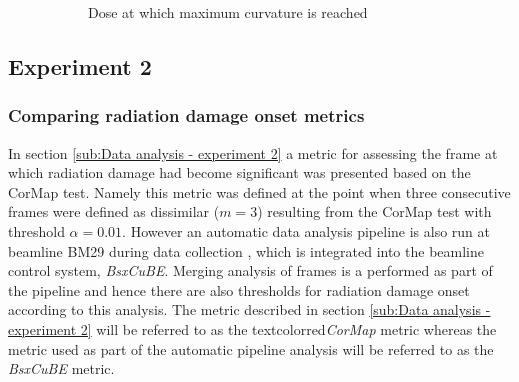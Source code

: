\begin{figure}
\begin{subfigure}[b]{0.8\textwidth}
            \caption{Dose at which maximum curvature is reached}
            \label{fig:Scavenger plot - maximum curvature}
    \end{subfigure}
    \caption{}
    \label{fig:Combined Scavenger results - Rebecca data}
\end{figure}

\subsection{Experiment 2}
\label{sub:Experiment 2 - Results}

\subsubsection{Comparing radiation damage onset metrics}
\label{subs:Comparing radiation damage onset metrics}
In section \ref{sub:Data analysis - experiment 2} a metric for assessing the frame at which radiation damage had become significant was presented based on the CorMap test.
Namely this metric was defined at the point when three consecutive frames were defined as dissimilar ($m = 3$) resulting from the CorMap test with threshold $\alpha = 0.01$.
However an automatic data analysis pipeline is also run at beamline BM29 during data collection \cite{brennich2016online}, which is integrated into the beamline control system, \textit{BsxCuBE}.
Merging analysis of frames is a performed as part of the pipeline and hence there are also thresholds for radiation damage onset according to this analysis.
The metric described in section \ref{sub:Data analysis - experiment 2} will be referred to as the textcolor{red}{\textit{CorMap}} metric whereas the metric used as part of the automatic pipeline analysis will be referred to as the \textit{BsxCuBE} metric.

